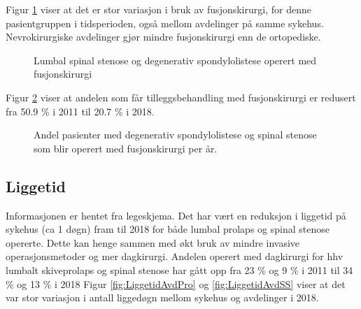 \documentclass [norsk,a4paper,twoside]{article}\usepackage[]{graphicx}\usepackage[]{color}
\begin{document}
Figur \ref{fig:degSponFusj} viser at det er stor variasjon i bruk av fusjonskirurgi, 
for denne pasientgruppen i tidsperioden, også mellom avdelinger på samme sykehus. Nevrokirurgiske avdelinger gjør mindre fusjonskirurgi enn de ortopediske.
\begin{figure}[ht]
\caption{\label{fig:degSponFusj} Lumbal spinal stenose og degenerativ spondylolistese operert med fusjonskirurgi}
\end{figure}

Figur \ref{fig:degSponFusjSStid} viser at andelen som får 
tilleggsbehandling med fusjonskirurgi er redusert fra 50.9 \% 
i 2011 til 20.7 \% i 2018.

\begin{figure}[ht]
\caption{\label{fig:degSponFusjSStid} Andel pasienter med degenerativ spondylolistese og spinal stenose som blir operert med fusjonskirurgi per år.}
\end{figure}



\clearpage


\subsection{Liggetid}

Informasjonen er hentet fra legeskjema.
Det har vært en reduksjon i liggetid  på sykehus (ca 1 døgn) fram til 2018 for både lumbal prolaps og spinal stenose opererte. 
Dette kan henge sammen med økt bruk av mindre invasive operasjonsmetoder og mer dagkirurgi. 
Andelen operert med dagkirurgi for hhv lumbalt skiveprolaps og spinal stenose har gått opp fra 
23 \% og 9 \%  i 2011 til 34 \% og 13 \%  i 2018  
Figur \ref{fig:LiggetidAvdPro} og \ref{fig:LiggetidAvdSS} viser at det var stor variasjon i antall liggedøgn mellom sykehus og avdelinger i 2018.


      
      
      

\end{document}
